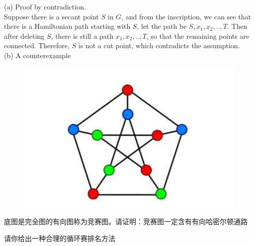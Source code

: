 \documentclass[a4paper, justified]{tufte-handout}
\begin{document}
\begin{solution}
  (a)
  Proof by contradiction.\\
  Suppose there is a secant point $S$ in $G$, and from the inscription, we can see that there is a Hamiltonian path starting with $S$, let the path be $S, x_1, x_2,.., T$. Then after deleting $S$, there is still a path $x_1, x_2,..,T$, so that the remaining points are connected. Therefore, $S$ is not a cut point, which contradicts the assumption.\\
  (b)
  A counterexample\\
  \begin{figure}[htbp]
    \centering
    \includegraphics[width = 0.30\linewidth]{figs/a.jpg}
  \end{figure}
\end{solution}



\beginot
\begin{ot}[竞赛图]
  底图是完全图的有向图称为竞赛图。请证明：竞赛图一定含有有向哈密尔顿通路


\end{ot}


\begin{ot}[循环赛排名]
  请你给出一种合理的循环赛排名方法


\end{ot}





% 
\end{document}

